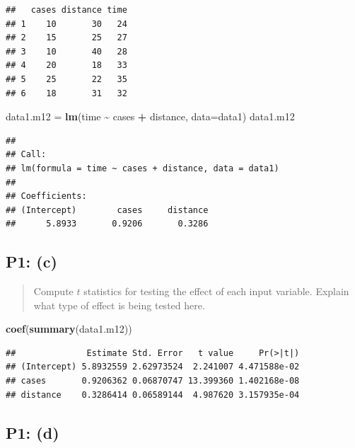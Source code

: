 \documentclass[
]{article}
\newenvironment{Shaded}{\begin{snugshade}}{\end{snugshade}}
\newcommand{\AttributeTok}[1]{\textcolor[rgb]{0.13,0.29,0.53}{#1}}
\newcommand{\FunctionTok}[1]{\textcolor[rgb]{0.13,0.29,0.53}{\textbf{#1}}}
\newcommand{\NormalTok}[1]{#1}
\newcommand{\OtherTok}[1]{\textcolor[rgb]{0.56,0.35,0.01}{#1}}
\newcommand{\SpecialCharTok}[1]{\textcolor[rgb]{0.81,0.36,0.00}{\textbf{#1}}}
\begin{document}
\begin{verbatim}
##   cases distance time
## 1    10       30   24
## 2    15       25   27
## 3    10       40   28
## 4    20       18   33
## 5    25       22   35
## 6    18       31   32
\end{verbatim}

\begin{Shaded}
\begin{Highlighting}[]
\NormalTok{data1.m12 }\OtherTok{=} \FunctionTok{lm}\NormalTok{(time }\SpecialCharTok{\textasciitilde{}}\NormalTok{ cases }\SpecialCharTok{+}\NormalTok{ distance, }\AttributeTok{data=}\NormalTok{data1)}
\NormalTok{data1.m12}
\end{Highlighting}
\end{Shaded}

\begin{verbatim}
## 
## Call:
## lm(formula = time ~ cases + distance, data = data1)
## 
## Coefficients:
## (Intercept)        cases     distance  
##      5.8933       0.9206       0.3286
\end{verbatim}

\hypertarget{p1-c}{%
\subsection{P1: (c)}\label{p1-c}}

\begin{quote}
Compute \(t\) statistics for testing the effect of each input variable.
Explain what type of effect is being tested here.
\end{quote}

\begin{Shaded}
\begin{Highlighting}[]
\FunctionTok{coef}\NormalTok{(}\FunctionTok{summary}\NormalTok{(data1.m12))}
\end{Highlighting}
\end{Shaded}

\begin{verbatim}
##              Estimate Std. Error   t value     Pr(>|t|)
## (Intercept) 5.8932559 2.62973524  2.241007 4.471588e-02
## cases       0.9206362 0.06870747 13.399360 1.402168e-08
## distance    0.3286414 0.06589144  4.987620 3.157935e-04
\end{verbatim}

\hypertarget{p1-d}{%
\subsection{P1: (d)}\label{p1-d}}
\end{document}
